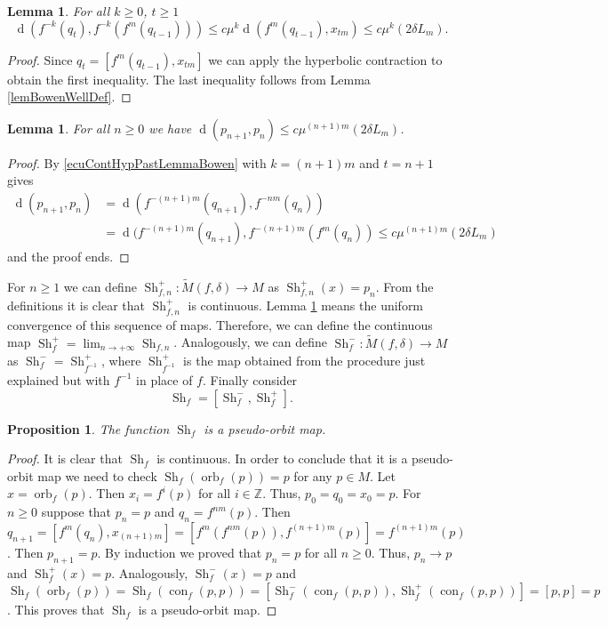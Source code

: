 \documentclass[12pt]{amsart}
\theoremstyle{plain}
\newtheorem{lem}[thm]{Lemma}
\newtheorem{prop}[thm]{Proposition}
\theoremstyle{definition}
\theoremstyle{remark}
\DeclareMathOperator{\dist}{d}
\DeclareMathOperator{\orb}{orb}
\DeclareMathOperator{\con}{con}
\DeclareMathOperator{\shm}{Sh}
\newcommand{\Z}{\mathbb Z}
\renewcommand{\epsilon}{\varepsilon}
\newcommand{\tM}{\tilde{M}}
\begin{document}
\begin{lem}
	\label{lemContHypPastLemmaBowen}
	For all $k\geq 0$, $t\geq 1$
	\begin{equation}
		\label{ecuContHypPastLemmaBowen}
		\dist(f^{-k}(q_t),f^{-k}(f^m(q_{t-1})))\leq
		c\mu^k\dist(f^m(q_{t-1}),x_{tm})\leq
		c\mu^k(2\delta L_m).
	\end{equation}
\end{lem}

\begin{proof}
	Since
	$q_t=[f^m(q_{t-1}),x_{tm}]$
	we can apply the hyperbolic contraction to obtain the first inequality.
	The last inequality follows from Lemma \ref{lemBowenWellDef}.
\end{proof}



\begin{lem}
	\label{lemConvUnifShm}
	For all $n\geq 0$ we have $\dist(p_{n+1},p_n)\leq
	c\mu^{(n+1)m}(2\delta L_m)$.
\end{lem}

\begin{proof}
	By \eqref{ecuContHypPastLemmaBowen} with $k=(n+1)m$ and $t=n+1$ gives
	\begin{align*}
		\dist(p_{n+1},p_n)&=
		\dist(f^{-(n+1)m}(q_{n+1}),f^{-nm}(q_n))\\
		&=
		\dist(f^{-(n+1)m}(q_{n+1}),f^{-(n+1)m}(f^m(q_n))
		\leq c\mu^{(n+1)m}(2\delta L_m)
	\end{align*}
	and the proof ends.
\end{proof}

For $n\geq 1$ we can define
$\shm_{f,n}^+\colon \tM(f,\delta)\to M$ as
$\shm_{f,n}^+(x)=p_n$.
From the definitions it is clear that $\shm_{f,n}^+$ is continuous.
Lemma \ref{lemConvUnifShm} means the uniform convergence of this sequence of maps.
Therefore, we can define the continuous map
$\shm_f^+=\lim_{n\to+\infty} \shm_{f,n}$.
Analogously, we can define
$\shm_f^-\colon \tM(f,\delta)\to M$ as
$\shm_f^-=\shm_{f^{-1}}^+$,
where $\shm_{f^{-1}}^+$ is the map obtained from the procedure just explained but with $f^{-1}$ in place of $f$.
Finally consider
\begin{equation}
	\label{ecuShFromBr}
	\shm_f=[\shm_f^-,\shm_f^+].
\end{equation}


\begin{prop}
	The function $\shm_f$ is a pseudo-orbit map.
\end{prop}
\begin{proof}
	It is clear that $\shm_f$ is continuous.
	In order to conclude that it is a pseudo-orbit map we need to check
	$\shm_f(\orb_f(p))=p$ for any $p\in M$.
	Let $x=\orb_f(p)$. Then $x_i=f^i(p)$ for all $i\in\Z$.
	Thus, $p_0=q_0=x_0=p$.
	For $n\geq 0$ suppose that $p_n=p$ and $q_n=f^{nm}(p)$.
	Then $q_{n+1}=[f^m(q_n),x_{(n+1)m}]=[f^m(f^{nm}(p)),f^{(n+1)m}(p)]=f^{(n+1)m}(p)$. Then $p_{n+1}=p$. By induction we proved that $p_n=p$ for all $n\geq 0$.
	Thus, $p_n\to p$ and $\shm_f^+(x)=p$.
	Analogously, $\shm_f^-(x)=p$ and
	$\shm_f(\orb_f(p))
	=\shm_f(\con_f(p,p))
	=[\shm_f^-(\con_f(p,p)),\shm_f^+(\con_f(p,p))]=[p,p]=p$.
	This proves that $\shm_f$ is a pseudo-orbit map.
\end{proof}
\end{document}
